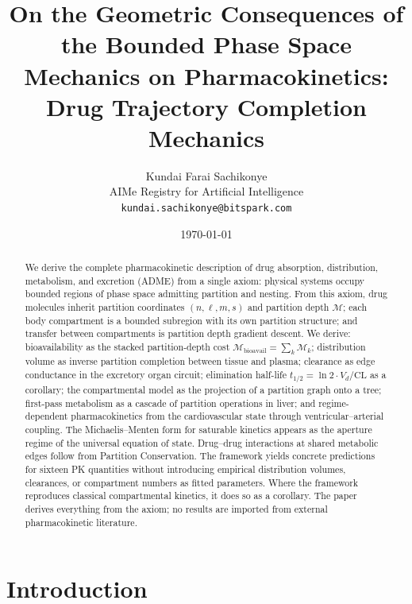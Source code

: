 \documentclass[twocolumn,10pt,a4paper]{article}
\theoremstyle{definition}
\theoremstyle{remark}
\newcommand{\Depth}{\mathcal{M}}
\begin{document}
\title{\textbf{On the Geometric Consequences of the Bounded Phase Space Mechanics on Pharmacokinetics:\\ Drug Trajectory Completion Mechanics}}

\author{
Kundai Farai Sachikonye\\
AIMe Registry for Artificial Intelligence\\
\texttt{kundai.sachikonye@bitspark.com}
}

\date{\today}
\maketitle

\begin{abstract}
\noindent We derive the complete pharmacokinetic description of drug absorption, distribution, metabolism, and excretion (ADME) from a single axiom: physical systems occupy bounded regions of phase space admitting partition and nesting. From this axiom, drug molecules inherit partition coordinates $(n,\ell,m,s)$ and partition depth $\Depth$; each body compartment is a bounded subregion with its own partition structure; and transfer between compartments is partition depth gradient descent. We derive: bioavailability as the stacked partition-depth cost $\Depth_{\mathrm{bioavail}} = \sum_k \Depth_k$; distribution volume as inverse partition completion between tissue and plasma; clearance as edge conductance in the excretory organ circuit; elimination half-life $t_{1/2} = \ln 2\cdot V_d/\mathrm{CL}$ as a corollary; the compartmental model as the projection of a partition graph onto a tree; first-pass metabolism as a cascade of partition operations in liver; and regime-dependent pharmacokinetics from the cardiovascular state through ventricular--arterial coupling. The Michaelis--Menten form for saturable kinetics appears as the aperture regime of the universal equation of state. Drug--drug interactions at shared metabolic edges follow from Partition Conservation. The framework yields concrete predictions for sixteen PK quantities without introducing empirical distribution volumes, clearances, or compartment numbers as fitted parameters. Where the framework reproduces classical compartmental kinetics, it does so as a corollary. The paper derives everything from the axiom; no results are imported from external pharmacokinetic literature.
\end{abstract}

\section{Introduction}
\end{document}

